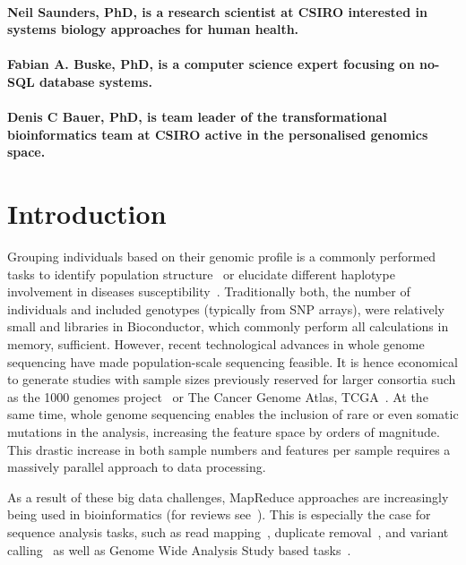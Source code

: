 \documentclass{bioinfo}
\begin{document}
\paragraph{Neil Saunders, PhD, is a research scientist at CSIRO interested in systems biology approaches for human health.}

\paragraph{Fabian A. Buske, PhD, is a computer science expert focusing on no-SQL database systems.}

\paragraph{Denis C Bauer, PhD, is team leader of the transformational bioinformatics team at CSIRO active in the personalised genomics space.}


\section{Introduction}

Grouping individuals based on their genomic profile is a commonly performed tasks to identify population structure~\citep{Gao2007} or elucidate different haplotype involvement in diseases susceptibility~\citep{Laitman2013}.  
Traditionally both, the number of individuals and included genotypes (typically from SNP arrays), were relatively small and libraries in Bioconductor, which commonly perform all calculations in memory, sufficient. 
However, recent technological advances in whole genome sequencing have made population-scale sequencing feasible. 
It is hence economical to generate studies with sample sizes previously reserved for larger consortia such as the 1000 genomes project~\citep{1KG2012} or The Cancer Genome Atlas, TCGA~\citep{TCGA2013}. 
At the same time, whole genome sequencing enables the inclusion of rare or even somatic mutations in the analysis, increasing the feature space by orders of magnitude. This drastic increase in both sample numbers and features per sample requires a massively parallel approach to data processing. 

As a result of these big data challenges, MapReduce approaches are increasingly being used in bioinformatics (for reviews see~\citep{Zou2013, Qiu2010,Taylor2010}). This is especially the case for sequence analysis tasks, such as read mapping~\citep{Schatz2009}, duplicate removal~\citep{Jourdren2012}, and variant calling~\citep{Langmead2009, McKenna2010} as well as Genome Wide Analysis Study based tasks~\citep{Huang2013, Guo2014}.
\end{document}
